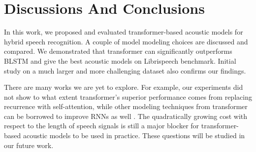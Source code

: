 \documentclass{article}
\begin{document}
\section{Discussions And Conclusions}
\label{sec:con}

In this work, we proposed and evaluated transformer-based acoustic models for hybrid speech recognition. A couple of model modeling choices are discussed and compared. We demonstrated that transformer can significantly outperforms BLSTM and give the best acoustic models on Librispeech benchmark. Initial study on a much larger and more challenging dataset also confirms our findings. 

There are many works we are yet to explore. For example, our experiments did not show to what extent transformer's superior performance comes from replacing recurrence with self-attention, while other modeling techniques from transformer can be borrowed to improve RNNs as well \cite{chen2018best}. The quadratically growing cost with respect to the length of speech signals is still a major blocker for transformer-based acoustic models to be used in practice. These questions will be studied in our future work. 

\footnotesize


\end{document}
